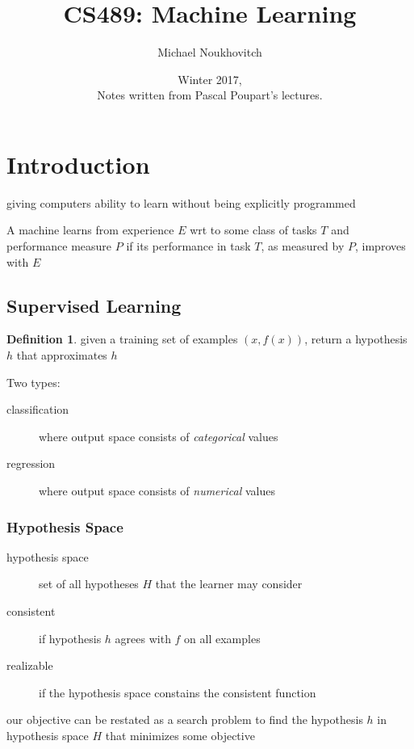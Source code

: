 \documentclass[]{article}
\theoremstyle{definition}
\newtheorem*{defn}{Definition}
\begin{document}
	\let\ref\Cref

	\title{\bf{CS489: Machine Learning}}
	\date{Winter 2017, \\ \center Notes written from Pascal Poupart's lectures.}
	\author{Michael Noukhovitch}

	\maketitle
	\newpage
	\tableofcontents
	\newpage

	\section{Introduction}
	\begin{description} 
		\item[machine learning] giving computers ability to learn without being explicitly programmed
		\item A machine learns from experience $E$ wrt to some class of tasks $T$ and performance measure $P$ if its performance in task $T$, as measured by $P$, improves with $E$
	\end{description}

	\subsection{Supervised Learning}
	\begin{defn}
		given a training set of examples $(x,f(x))$, return a hypothesis $h$ that approximates $h$
	\end{defn}
	Two types:
	\begin{description}
		\item[classification] where output space consists of \textit{categorical} values
		\item[regression] where output space consists of \textit{numerical} values
	\end{description}

	\subsubsection{Hypothesis Space}
	\begin{description}
		\item[hypothesis space] set of all hypotheses $H$ that the learner may consider
		\item[consistent] if hypothesis $h$ agrees with $f$ on all examples
		\item[realizable] if the hypothesis space constains the consistent function
	\end{description}
	our objective can be restated as a search problem to find the hypothesis $h$ in hypothesis space $H$ that minimizes some objective
\end{document}
